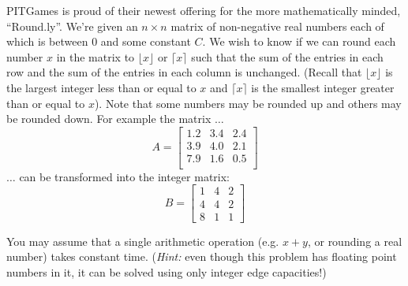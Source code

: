 \documentclass[12 pt, letterpaper]{hmcpset}
\begin{document}
\begin{problem}
	PITGames is proud of their newest offering for the more
mathematically minded, ``Round.ly''. We're given an $n \times n $ matrix of
non-negative real numbers each of which is between $0$ and some constant $C$.
We wish to know if we can round each number $x$ in the matrix to $\lfloor x
\rfloor$ or $\lceil x \rceil$ such that the sum of the entries in each row and
the sum of the entries in each column is unchanged.  (Recall that $\lfloor x
\rfloor$ is the largest integer less than or equal to $x$ and $\lceil x \rceil$
is the smallest integer greater than or equal to $x$).  Note that some numbers
may be rounded up and others may be rounded down.  For example the matrix
$\dots$
\[ A =
\begin{bmatrix}
1.2 & 3.4 & 2.4 \\
3.9 & 4.0 & 2.1 \\
7.9 & 1.6 & 0.5 \\
\end{bmatrix}
\] $\dots$ can be transformed into the integer matrix:
\[
B = 
\begin{bmatrix}
1 & 4 & 2 \\
4 & 4 & 2 \\
8 & 1 & 1
\end{bmatrix}
\]

You may assume that a single arithmetic operation (e.g. $x + y$, or rounding a real number) takes constant time. (\emph{Hint:} even though this problem has floating point numbers in it, it can be solved using only integer edge capacities!)
\end{problem}
\end{document}
